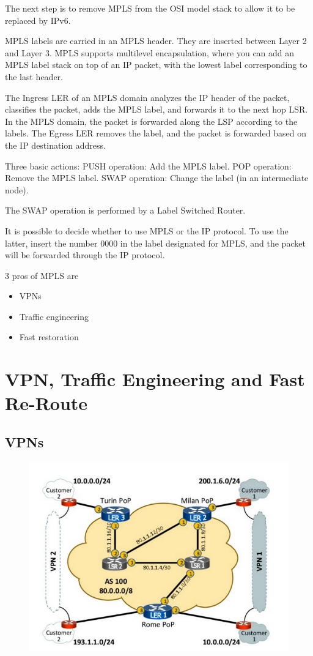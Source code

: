\documentclass[12pt]{article}
\begin{document}
The next step is to remove MPLS from the OSI model stack to allow it to be replaced by IPv6.

MPLS labels are carried in an MPLS header. They are inserted between Layer 2 and Layer 3. MPLS supports multilevel encapsulation, where you can add an MPLS label stack on top of an IP packet, with the lowest label corresponding to the last header.

The Ingress LER of an MPLS domain analyzes the IP header of the packet, classifies the packet, adds the MPLS label, and forwards it to the next hop LSR. In the MPLS domain, the packet is forwarded along the LSP according to the labels. The Egress LER removes the label, and the packet is forwarded based on the IP destination address.

Three basic actions:
    PUSH operation: Add the MPLS label.
    POP operation: Remove the MPLS label.
    SWAP operation: Change the label (in an intermediate node).

The SWAP operation is performed by a Label Switched Router.

It is possible to decide whether to use MPLS or the IP protocol. To use the latter, insert the number 0000 in the label designated for MPLS, and the packet will be forwarded through the IP protocol.

3 pros of MPLS are 
\begin{itemize}
    \item VPNs
    \item Traffic engineering
    \item Fast restoration
\end{itemize}


\newpage
\section*{VPN, Traffic Engineering and Fast Re-Route}

\subsection*{VPNs}
\begin{figure}[ht]
    \includegraphics[scale = 0.4]{Example3.png}
    \centering
\end{figure}
\end{document}

